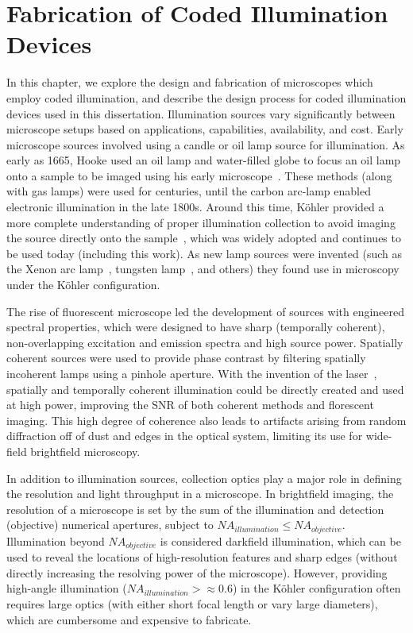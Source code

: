 \chapter{Fabrication of Coded Illumination Devices}\label{ch:fabrication}

In this chapter, we explore the design and fabrication of microscopes which employ coded illumination, and describe the design process for coded illumination devices used in this dissertation. Illumination sources vary significantly between microscope setups based on applications, capabilities, availability, and cost. Early microscope sources involved using a candle or oil lamp source for illumination. As early as 1665, Hooke used an oil lamp and water-filled globe to focus an oil lamp onto a sample to be imaged using his early microscope~\cite{hookeMicrographica}. These methods (along with gas lamps) were used for centuries, until the carbon arc-lamp enabled electronic illumination in the late 1800s. Around this time, K\"ohler provided a more complete understanding of proper illumination collection to avoid imaging the source directly onto the sample~\cite{kohler1893neues}, which was widely adopted and continues to be used today (including this work). As new lamp sources were invented (such as the Xenon arc lamp~\cite{anderson1951xenon}, tungsten lamp~\cite{edison1880electric}, and others) they found use in microscopy under the K\"ohler configuration.

The rise of fluorescent microscope led the development of sources with engineered spectral properties, which were designed to have sharp (temporally coherent), non-overlapping excitation and emission spectra and high source power. Spatially coherent sources were used to provide phase contrast \cite{smithDIC, zernike1942phase} by filtering spatially incoherent lamps using a pinhole aperture. With the invention of the laser~\cite{schawlow1958infrared}, spatially and temporally coherent illumination could be directly created and used at high power, improving the SNR of both coherent methods and florescent imaging. This high degree of coherence also leads to artifacts arising from random diffraction off of dust and edges in the optical system, limiting its use for wide-field brightfield microscopy.

In addition to illumination sources, collection optics play a major role in defining the resolution and light throughput in a microscope. In brightfield imaging, the resolution of a microscope is set by the sum of the illumination and detection (objective) numerical apertures, subject to $NA_{illumination} \leq NA_{objective}$. Illumination beyond $NA_{objective}$ is considered darkfield illumination, which can be used to reveal the locations of high-resolution features and sharp edges (without directly increasing the resolving power of the microscope). However, providing high-angle illumination ($NA_{illumination} >\approx 0.6$) in the K\"ohler configuration often requires large optics (with either short focal length or vary large diameters), which are cumbersome and expensive to fabricate.

